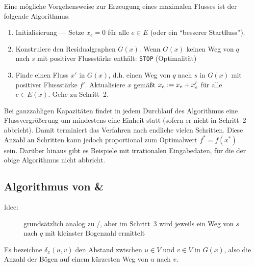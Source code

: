 Eine mögliche Vorgehensweise zur Erzeugung eines maximalen Flusses ist der folgende Algorithmus:

\begin{enumerate}[label=Schritt \arabic*:, leftmargin=*, start=1]
	\item Initialisierung --- Setze $x_e = 0$ für alle $e \in E$ (oder ein \enquote{besserer Startfluss}).
	\item Konstruiere den Residualgraphen $G(x)$. Wenn $G(x)$ keinen Weg von $q$ nach $s$ mit positiver Flussstärke enthält: \texttt{STOP} (Optimalität)
	\item Finde einen Fluss $x'$ in $G(x)$, d.h. einen Weg von $q$ nach $s$ in $G(x)$ mit positiver Flussstärke $f'$. Aktualisiere $x$ gemäßt $x_e \mathrel{:=} x_e + x_e'$ für alle $e \in E(x)$. Gehe zu Schritt~2.
\end{enumerate}

Bei ganzzahligen Kapazitäten findet in jedem Durchlauf des Algorithmus eine Flussvergrößerung um mindestens eine Einheit statt (sofern er nicht in Schritt~2 abbricht). Damit terminiert das Verfahren nach endliche vielen Schritten. Diese Anzahl an Schritten kann jedoch proportional zum Optimalwert $f^\ast = f(x^\ast)$ sein.
Darüber hinaus gibt es Beispiele mit irrationalen Eingabedaten, für die der obige Algorithmus nicht abbricht.

\subsection{Algorithmus von  \& }

\begin{description}
	\item[Idee:] grundsätzlich analog zu /, aber im Schritt~3 wird jeweils ein Weg von $s$ nach $q$ mit kleinster Bogenzahl ermittelt
\end{description}

Es bezeichne $\delta_x(u,v)$ den Abstand zwischen $u \in V$ und $v \in V$ in $G(x)$, also die Anzahl der Bögen auf einem kürzesten Weg von $u$ nach $v$.

